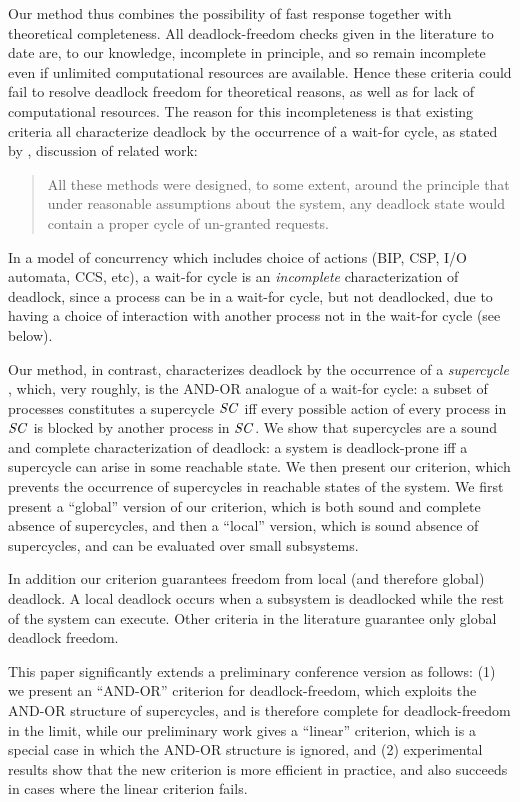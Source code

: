 Our method thus combines the possibility of fast response together with theoretical completeness.
All deadlock-freedom checks given in the literature to date are, to our knowledge, incomplete in
principle, and so remain incomplete even if unlimited computational resources are available.
Hence these criteria could fail to resolve deadlock freedom for theoretical reasons, as well as for 
lack of computational resources.
%
The reason for this incompleteness is that existing criteria all characterize deadlock by the
occurrence of a wait-for cycle, \eg as stated by , discussion of related
work:
\begin{quote}
All these methods were designed, to some extent, around the principle that under reasonable
assumptions about the system, any deadlock state would contain a proper cycle of un-granted requests.
\end{quote}
In a model of concurrency which includes choice of actions
(\eg BIP, CSP, I/O automata, CCS, etc), a wait-for cycle is an \emph{incomplete} characterization of
deadlock, since a process can be in a wait-for cycle, but not deadlocked, due to having a choice of
interaction with another process not in the wait-for cycle (see  below).

Our method, in contrast, characterizes deadlock by the occurrence of a \emph{supercycle} \cite{AE98,AC05}, which, very roughly, is the AND-OR analogue
of a wait-for cycle: a subset of processes constitutes a supercycle $\mathit{SC}$ iff every possible action of every process in $\mathit{SC}$ is blocked by another
process in $\mathit{SC}$.
%
We show that supercycles are a sound and complete characterization of deadlock: a system is deadlock-prone iff a supercycle can arise in some
reachable state.
%
We then present our criterion, which prevents the occurrence of supercycles in reachable states of
the system. We first present a ``global'' version of our criterion, which is both sound and complete
\wrt absence of supercycles, and then a ``local'' version, which is sound \wrt absence of
supercycles, and can be evaluated over small subsystems.

In addition our criterion guarantees freedom from local (and therefore global) deadlock. A local deadlock occurs when 
a subsystem is deadlocked while the rest of the system can execute. Other criteria in the literature \cite{AGR16,Ma96,RD87,DFinder2,BR91,MM12,GS03,AB03} guarantee only global deadlock freedom.

This paper significantly extends a preliminary conference version \cite{FORTE13} as
follows: 
(1) we present an ``AND-OR'' criterion for deadlock-freedom, which exploits the AND-OR structure of supercycles, and is therefore complete for
deadlock-freedom in the limit, while our preliminary work \cite{FORTE13} gives a ``linear'' criterion, which is a special case in which the AND-OR structure is ignored, and
(2) experimental results show that the new criterion is more efficient in practice, and also succeeds in cases where the linear criterion fails.

